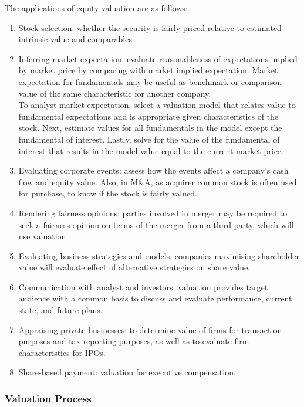 \begin{remark} The applications of equity valuation are as follows:
\begin{enumerate}[label=\roman*.]
\setlength{\itemsep}{0pt}
\item Stock selection: whether the security is fairly priced relative to estimated intrinsic value and comparables
\item Inferring market expectation: evaluate reasonableness of expectations implied by market price by comparing with market implied expectation. Market expectation for fundamentals may be useful as benchmark or comparison value of the same characteristic for another company.\\
To analyst market expectation, select a valuation model that relates value to fundamental expectations and is appropriate given characteristics of the stock. Next, estimate values for all fundamentals in the model except the fundamental of interest. Lastly, solve for the value of the fundamental of interest that results in the model value equal to the current market price.
\item Evaluating corporate events: assess how the events affect a company's cash flow and equity value. Also, in M\&A, as acquirer common stock is often used for purchase, to know if the stock is fairly valued.
\item Rendering fairness opinions: parties involved in merger may be required to seek a fairness opinion on terms of the merger from a third party, which will use valuation.
\item Evaluating business strategies and models: companies maximising shareholder value will evaluate effect of alternative strategies on share value.
\item Communication with analyst and investors: valuation provides target audience with a common basis to discuss and evaluate performance, current state, and future plans.
\item Appraising private businesses: to determine value of firms for transaction purposes and tax-reporting purposes, as well as to evaluate firm characteristics for IPOs.
\item Share-based payment: valuation for executive compensation.
\end{enumerate}
\end{remark}

\subsubsection{Valuation Process}

